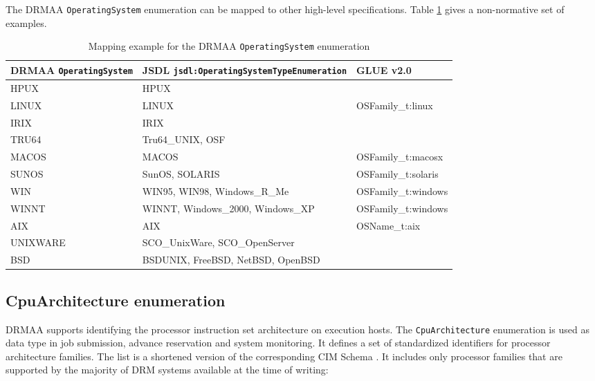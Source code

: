 \documentclass{article}
\newcommand{\h}[1]{\lstinline|#1|}
\begin{document}
The DRMAA \h{OperatingSystem} enumeration can be mapped to other high-level specifications. Table \ref{tab:osmappings} gives a non-normative set of examples.

\begin{table}[ht]
\centering
\begin{tabularx}{\textwidth}{|l|X|l|}
\hline
DRMAA \h{OperatingSystem} & JSDL \h{jsdl:OperatingSystemTypeEnumeration} & GLUE v2.0 \\
\hline
HPUX	&	HPUX & \\
LINUX	& 	LINUX  & OSFamily\_t:linux \\
IRIX	&	IRIX &  \\
TRU64 	&	Tru64\_UNIX, OSF & \\
MACOS 	&	MACOS & OSFamily\_t:macosx \\
SUNOS 	&	SunOS, SOLARIS & OSFamily\_t:solaris \\
WIN 	&	WIN95, WIN98, Windows\_R\_Me & OSFamily\_t:windows \\
WINNT 	&	WINNT, Windows\_2000, Windows\_XP & OSFamily\_t:windows \\
AIX 	&	AIX  &  OSName\_t:aix \\
UNIXWARE &	SCO\_UnixWare, SCO\_OpenServer & \\
BSD 	&	BSDUNIX, FreeBSD, NetBSD, OpenBSD & \\
\hline
\end{tabularx}
\caption{Mapping example for the DRMAA \h{OperatingSystem} enumeration}
\label{tab:osmappings}
\end{table}

\subsection{CpuArchitecture enumeration}
\label{sec:cpuarchs}

DRMAA supports identifying the processor instruction set architecture on execution hosts. The \h{CpuArchitecture} enumeration is used as data type in job submission, advance reservation and system monitoring. It defines a set of standardized identifiers for processor architecture families. The list is a shortened version of the corresponding CIM Schema \cite{cim}. It includes only processor families that are supported by the majority of DRM systems available at the time of writing:


\end{document}
